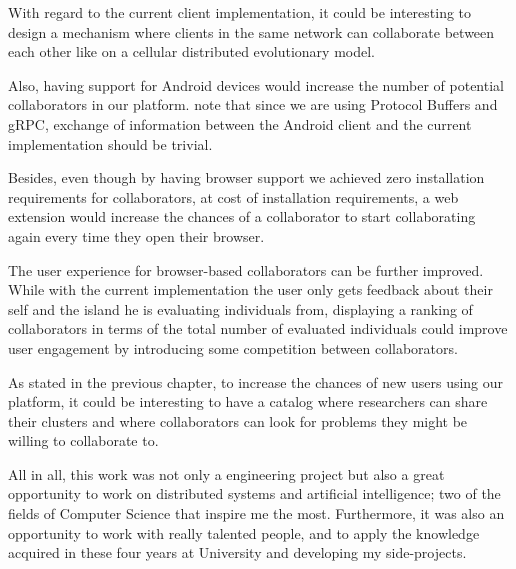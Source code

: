 With regard to the current client implementation, it could be interesting to design a mechanism where clients in the same network can collaborate between each other like on a cellular distributed evolutionary model. 

Also, having support for Android devices would increase the number of potential collaborators in our platform. note that since we are using Protocol Buffers and gRPC, exchange of information between the Android client and the current implementation should be trivial. 

Besides, even though by having browser support we achieved zero installation requirements for collaborators, at cost of installation requirements, a web extension would increase the chances of a collaborator to start collaborating again every time they open their browser.

The user experience for browser-based collaborators can be further improved. While with the current implementation the user only gets feedback about their self and the island he is evaluating individuals from, displaying a ranking of collaborators in terms of the total number of evaluated individuals could improve user engagement by introducing some competition between collaborators. 

As stated in the previous chapter, to increase the chances of new users using our platform, it could be interesting to have a catalog where researchers can share their clusters and where collaborators can look for problems they might be willing to collaborate to.

All in all, this work was not only a engineering project but also a great opportunity to work on distributed systems and artificial intelligence; two of the fields of Computer Science that inspire me the most. Furthermore, it was also an opportunity to work with really talented people, and to apply the knowledge acquired in these four years at University and developing my side-projects.